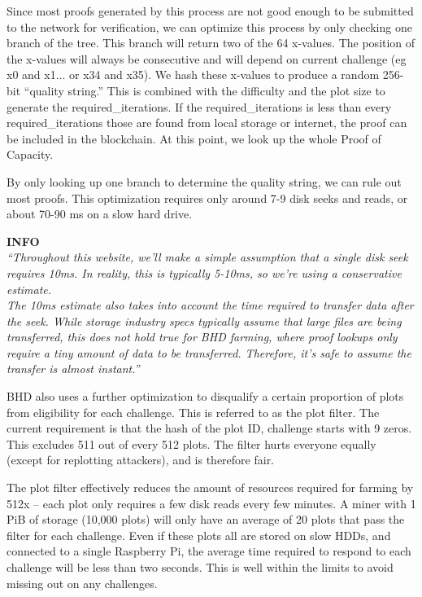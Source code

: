 \begin{flushleft}
    Since most proofs generated by this process are not good enough to be submitted to the network for verification, we can optimize this process by only checking one branch of the tree. This branch will return two of the 64 x-values. The position of the x-values will always be consecutive and will depend on current challenge (eg x0 and x1... or x34 and x35). We hash these x-values to produce a random 256-bit ``quality string.'' This is combined with the difficulty and the plot size to generate the required\_iterations. If the required\_iterations is less than every required\_iterations those are found from local storage or internet, the proof can be included in the blockchain. At this point, we look up the whole Proof of Capacity.
\end{flushleft}
\begin{flushleft}
    By only looking up one branch to determine the quality string, we can rule out most proofs. This optimization requires only around 7-9 disk seeks and reads, or about 70-90 ms on a slow hard drive.
\end{flushleft}
\begin{flushleft}
    \textbf{INFO}\\[5pt]
    \textit{``Throughout this website, we'll make a simple assumption that a single disk seek requires 10ms. In reality, this is typically 5-10ms, so we're using a conservative estimate.\\[5pt]
    The 10ms estimate also takes into account the time required to transfer data after the seek. While storage industry specs typically assume that large files are being transferred, this does not hold true for BHD farming, where proof lookups only require a tiny amount of data to be transferred. Therefore, it's safe to assume the transfer is almost instant.''}
\end{flushleft}
\begin{flushleft}
    BHD also uses a further optimization to disqualify a certain proportion of plots from eligibility for each challenge. This is referred to as the plot filter. The current requirement is that the hash of the plot ID, challenge starts with 9 zeros. This excludes 511 out of every 512 plots. The filter hurts everyone equally (except for replotting attackers), and is therefore fair.
\end{flushleft}
\begin{flushleft}
    The plot filter effectively reduces the amount of resources required for farming by 512x -- each plot only requires a few disk reads every few minutes. A miner with 1 PiB of storage (10,000 plots) will only have an average of 20 plots that pass the filter for each challenge. Even if these plots all are stored on slow HDDs, and connected to a single Raspberry Pi, the average time required to respond to each challenge will be less than two seconds. This is well within the limits to avoid missing out on any challenges.
\end{flushleft}
